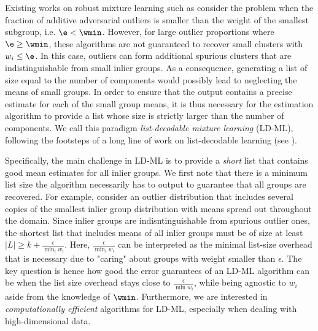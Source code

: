 Existing works on robust mixture learning such as \cite{diakonikolas2018list,bakshi2022robustly}
consider the problem when the fraction of additive adversarial outliers is smaller than the weight of the smallest subgroup, i.e. \(\e < \wmin\).
However, for large outlier proportions where $\e \geq \wmin$, these algorithms are not guaranteed to recover small clusters with  \(w_i \leq \e\). 
In this case, outliers can form additional spurious clusters
that are indistinguishable 
from small inlier groups. As a consequence, generating a list of size equal to the number of components would possibly lead to neglecting the means of small groups.
In order to ensure that the output contains 
a precise estimate for each of the small group means, 
it is thus necessary  
for the estimation algorithm to provide a list whose size is strictly larger than the number of components.
We call this paradigm \emph{list-decodable mixture learning} (LD-ML),
following the footsteps of a long line of work on list-decodable learning (see ). 

Specifically, the main challenge in LD-ML is to provide a \emph{short} list that contains good mean estimates for all inlier groups.
We first note that there is a minimum list size the algorithm necessarily has to output to guarantee that all groups are recovered. For example, consider an outlier distribution that includes several copies of the smallest inlier group distribution with means spread out throughout the domain. Since inlier groups are indisntinguishable from spurious outlier ones, the shortest list that includes means of all inlier groups must be of size at least $|L| \geq k + \frac{\epsilon}{\min_i w_i}$. Here, $\frac{\epsilon}{\min_i w_i}$ can be interpreted as the minimal list-size overhead that is necessary due to "caring" about groups with weight smaller than $\epsilon$.
The key question is hence how good the error guarantees of an LD-ML algorithm can be when the list size overhead stays close to $\frac{\epsilon}{\min w_i}$,
while being agnostic to $w_i$ aside from the knowledge of $\wmin$.
Furthermore, we are interested in \textit{computationally efficient} algorithms for LD-ML, especially when dealing with high-dimensional data.

